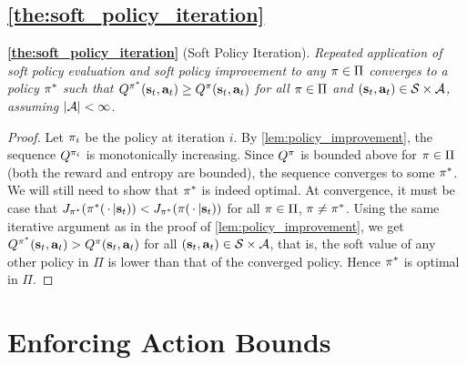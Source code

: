 \subsection{\autoref{the:soft_policy_iteration}}
\label{app:the_soft_policy_iteration}







\textbf{\autoref{the:soft_policy_iteration}} (Soft Policy Iteration). \textit{
Repeated application of soft policy evaluation and soft policy improvement to any $\pi\in\Pi$ converges to a policy $\pi^*$ such that $Q^{\pi^*}({\mathbf{s}_t}, {\mathbf{a}_t}) \geq Q^{\pi}({\mathbf{s}_t}, {\mathbf{a}_t})$ for all $\pi \in \Pi$ and $({\mathbf{s}_t}, {\mathbf{a}_t}) \in \mathcal{S}\times\mathcal{A}$, assuming $|\mathcal{A}|<\infty$.}
\begin{proof}
Let $\pi_i$ be the policy at iteration $i$. By \autoref{lem:policy_improvement}, the sequence $Q^{\pi_i}$ is monotonically increasing. Since $Q^\pi$ is bounded above for $\pi \in \Pi$ (both the reward and entropy are bounded), the sequence converges to some $\pi^*$. We will still need to show that $\pi^*$ is indeed optimal. At convergence, it must be case that $J_{\pi^*}({\pi^*}({\,\cdot\,}|{\mathbf{s}_t})) < J_{\pi^*}(\pi({\,\cdot\,}|{\mathbf{s}_t}))$ for all $\pi\in\Pi$, $\pi\neq \pi^*$. Using the same iterative argument as in the proof of \autoref{lem:policy_improvement}, we get $Q^{\pi^*}({\mathbf{s}_t}, {\mathbf{a}_t}) > Q^\pi({\mathbf{s}_t}, {\mathbf{a}_t})$ for all $({\mathbf{s}_t}, {\mathbf{a}_t})\in \mathcal{S}\times\mathcal{A}$, that is, the soft value of any other policy in $\Pi$ is lower than that of the converged policy. Hence ${\pi^*}$ is optimal in $\Pi$.
\end{proof}




\section{Enforcing Action Bounds}
\label{app:action_bounds}

